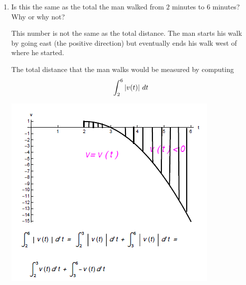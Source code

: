 \documentclass[ nooutcomes]{ximera}
\begin{document}
\begin{problem}
\begin{enumerate}
  \item  Is this the same as the total  the man walked from $2$ minutes to $6$ minutes?
    Why or why not?
    \begin{freeResponse}
      This number is not the same as the total distance.
      The man starts his walk by going east (the positive direction) but eventually ends his walk west of where he started.
      
      The total distance that the man walks would be measured by computing 
      $$\int_2^6 \left| v(t) \right| \,d t$$  
      \begin{image}
      \includegraphics[scale=.7]{figure1.png}
            \end{image}
    \end{freeResponse}
  \end{enumerate}
\end{problem}
\end{document}
